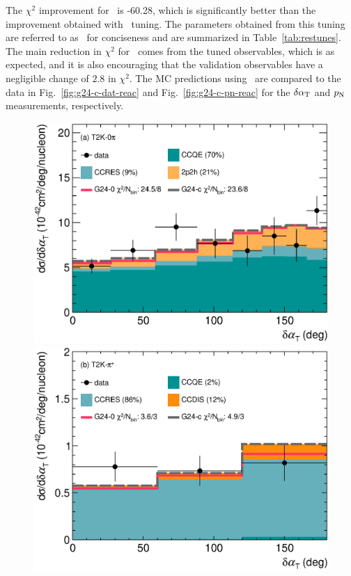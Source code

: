     The $\chi^2$ improvement for \cbRedPar\ is -60.28, which is significantly better than the improvement obtained with \cbAllPar\ tuning.
    The parameters obtained from this tuning are referred to as \gC\ for conciseness and are summarized in Table~\ref{tab:restunes}.
    The main reduction in $\chi^2$ for \gC\ comes from the tuned observables, which is as expected, and it is also encouraging that the validation observables have a negligible change of $2.8$ in $\chi^2$.
    The MC predictions using \gC\ are compared to the data in Fig.~\ref{fig:g24-c-dat-reac} and Fig.~\ref{fig:g24-c-pn-reac} for the $\delta\alpha_\textrm{T}$ and $p_\textrm{N}$ measurements, respectively.
    \begin{figure} 
        \centering 		
        \includegraphics[width=\dbfigwid\textwidth]{figures/tuning/0026-t2k_0pi_dalphat_reac_decomp_covfix.eps}
        \includegraphics[width=\dbfigwid\textwidth]{figures/tuning/0026-t2k_pip_dalphat_reac_decomp_covfix.eps}

\end{figure}
